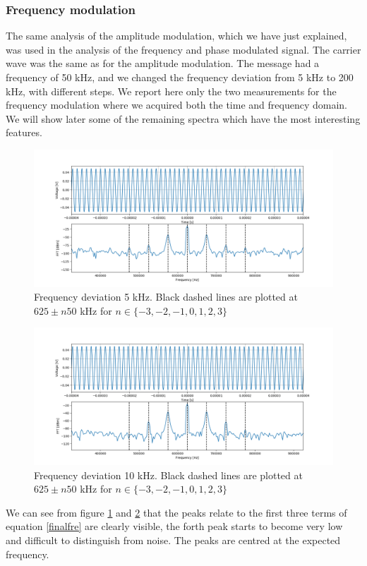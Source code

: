 \documentclass[a4paper,10pt]{article}
\begin{document}
\subsubsection{Frequency modulation}
The same analysis of the amplitude modulation, which we have just explained, was used in the analysis of the frequency and phase modulated signal. The carrier wave was the same as for the amplitude modulation. The message had a frequency of 50 kHz, and we changed the frequency deviation from 5 kHz to 200 kHz, with different steps. We report here only the two measurements for the frequency modulation where we acquired both the time and frequency domain. We will show later some of the remaining spectra which have the most interesting features.
\begin{figure}[H]
\centering
\includegraphics[width=\textwidth]{freq1}
\caption{Frequency deviation 5 kHz. Black dashed lines are plotted at $625\pm n50$ kHz for $n\in\{-3,-2,-1,0,1,2,3\}$}\label{freq1}
\end{figure}
\begin{figure}[H]
\centering
\includegraphics[width=\textwidth]{freq2}
\caption{Frequency deviation 10 kHz. Black dashed lines are plotted at $625\pm n50$ kHz for $n\in\{-3,-2,-1,0,1,2,3\}$}\label{freq2}
\end{figure}
We can see from figure \ref{freq1} and \ref{freq2} that the peaks relate to the first three terms of equation \eqref{finalfre} are clearly visible, the forth peak starts to become very low and difficult to distinguish from noise. The peaks are centred at the expected frequency.
\end{document}
